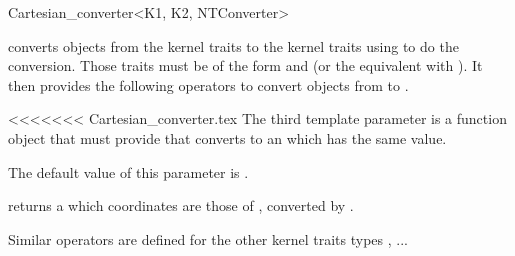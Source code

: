 \begin{ccRefClass}{Cartesian_converter<K1, K2, NTConverter>}

\KernelRefLayout\gdef\ccTagOperatorLayout{\ccFalse}

\ccDefinition

\ccClassTemplateName converts objects from the kernel traits  to
the kernel traits  using  to do the conversion.  
Those traits must be of the form
 and  (or the equivalent with
).  It then provides the following operators to convert
objects from  to .

<<<<<<< Cartesian_converter.tex
The third template parameter  is a function object that must
provide  that converts  to an
 which has the same value.

The default value of this parameter is .


\ccCreation
{}


\ccOperations

{ returns a  which coordinates are those of ,
converted by .}

Similar operators are defined for the other kernel traits types ,
...

\ccSeeAlso
{} \\
 \\

\end{ccRefClass}
